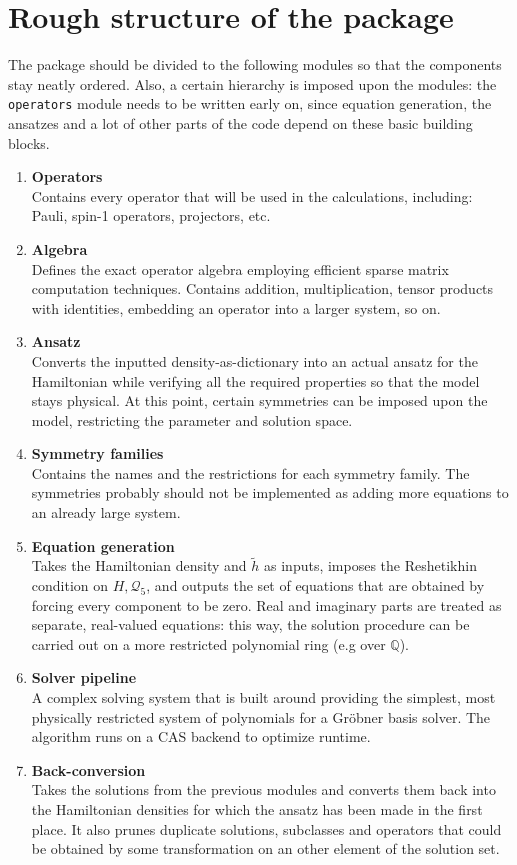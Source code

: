 \documentclass[a4paper, 11pt, twoside, onecolumn]{article}
\newcommand{\Q}{\mathcal{Q}}
\begin{document}
\section{Rough structure of the package}
The package should be divided to the following modules so that the components stay neatly ordered. Also, a certain hierarchy is imposed upon the modules: the \texttt{operators} module needs to be written early on, since equation generation, the ansatzes and a lot of other parts of the code depend on these basic building blocks.
\begin{enumerate}
    \item \textbf{Operators} \\
    Contains every operator that will be used in the calculations, including: Pauli, spin-1 operators, projectors, etc. 
    \item \textbf{Algebra} \\
    Defines the exact operator algebra employing efficient sparse matrix computation techniques. Contains addition, multiplication, tensor products with identities, embedding an operator into a larger system, so on.
    \item \textbf{Ansatz} \\
    Converts the inputted density-as-dictionary into an actual ansatz for the Hamiltonian while verifying all the required properties so that the model stays physical. At this point, certain symmetries can be imposed upon the model, restricting the parameter and solution space.
    \item \textbf{Symmetry families} \\
    Contains the names and the restrictions for each symmetry family. The symmetries probably should not be implemented as adding more equations to an already large system.
    \item \textbf{Equation generation} \\
    Takes the Hamiltonian density and $\tilde{h}$ as inputs, imposes the Reshetikhin condition on $H,\Q_5$, and outputs the set of equations that are obtained by forcing every component to be zero. Real and imaginary parts are treated as separate, real-valued equations: this way, the solution procedure can be carried out on a more restricted polynomial ring (e.g over $\mathbb{Q}$).
    \item \textbf{Solver pipeline} \\
    A complex solving system that is built around providing the simplest, most physically restricted system of polynomials for a Gröbner basis solver. The algorithm runs on a CAS backend to optimize runtime.
    \item \textbf{Back-conversion} \\
    Takes the solutions from the previous modules and converts them back into the Hamiltonian densities for which the ansatz has been made in the first place. It also prunes duplicate solutions, subclasses and operators that could be obtained by some transformation on an other element of the solution set.
\end{enumerate}
\end{document}
